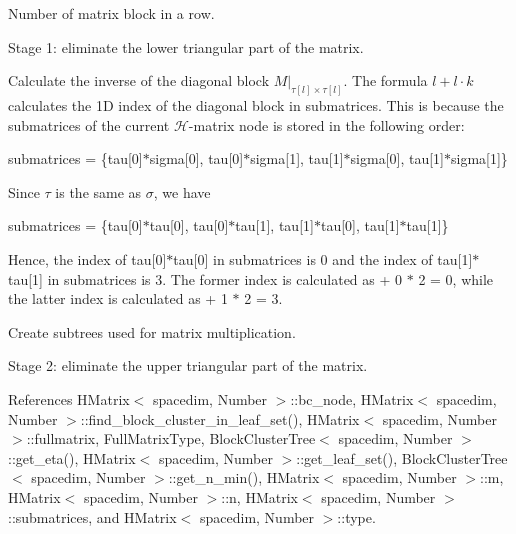 Number of matrix block in a row.

Stage 1\+: eliminate the lower triangular part of the matrix.

Calculate the inverse of the diagonal block $M \vert_{\tau[l]\times\tau[l]}$. The formula $l + l \cdot k$ calculates the 1D index of the diagonal block in {\ttfamily submatrices}. This is because the submatrices of the current $\mathcal{H}$-\/matrix node is stored in the following order\+:

{\ttfamily  submatrices = \{tau\mbox{[}0\mbox{]}$\ast$sigma\mbox{[}0\mbox{]}, tau\mbox{[}0\mbox{]}$\ast$sigma\mbox{[}1\mbox{]}, tau\mbox{[}1\mbox{]}$\ast$sigma\mbox{[}0\mbox{]}, tau\mbox{[}1\mbox{]}$\ast$sigma\mbox{[}1\mbox{]}\} }

Since $\tau$ is the same as $\sigma$, we have

{\ttfamily  submatrices = \{tau\mbox{[}0\mbox{]}$\ast$tau\mbox{[}0\mbox{]}, tau\mbox{[}0\mbox{]}$\ast$tau\mbox{[}1\mbox{]}, tau\mbox{[}1\mbox{]}$\ast$tau\mbox{[}0\mbox{]}, tau\mbox{[}1\mbox{]}$\ast$tau\mbox{[}1\mbox{]}\} }

Hence, the index of {\ttfamily tau}\mbox{[}0\mbox{]}$\ast$tau\mbox{[}0\mbox{]} in {\ttfamily submatrices} is 0 and the index of {\ttfamily tau}\mbox{[}1\mbox{]}$\ast$tau\mbox{[}1\mbox{]} in {\ttfamily submatrices} is 3. The former index is calculated as { + 0 $\ast$ 2 = 0}, while the latter index is calculated as { + 1 $\ast$ 2 = 3}.

Create subtrees used for matrix multiplication.

Stage 2\+: eliminate the upper triangular part of the matrix.

References H\+Matrix$<$ spacedim, Number $>$\+::bc\+\_\+node, H\+Matrix$<$ spacedim, Number $>$\+::find\+\_\+block\+\_\+cluster\+\_\+in\+\_\+leaf\+\_\+set(), H\+Matrix$<$ spacedim, Number $>$\+::fullmatrix, Full\+Matrix\+Type, Block\+Cluster\+Tree$<$ spacedim, Number $>$\+::get\+\_\+eta(), H\+Matrix$<$ spacedim, Number $>$\+::get\+\_\+leaf\+\_\+set(), Block\+Cluster\+Tree$<$ spacedim, Number $>$\+::get\+\_\+n\+\_\+min(), H\+Matrix$<$ spacedim, Number $>$\+::m, H\+Matrix$<$ spacedim, Number $>$\+::n, H\+Matrix$<$ spacedim, Number $>$\+::submatrices, and H\+Matrix$<$ spacedim, Number $>$\+::type.

\mbox{\label{classHMatrix_af40d53aabc8bec86fa543638d48ba64e}} 
